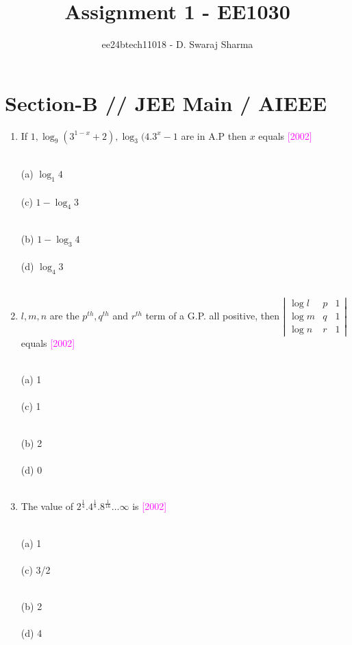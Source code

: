 \documentclass[journal,12pt,twocolumn]{IEEEtran}
\theoremstyle{remark}
\begin{document}

\vspace{3cm}

\title{Assignment 1 - EE1030}
\author{ee24btech11018 - D. Swaraj Sharma}
\maketitle
\newpage
\bigskip

\renewcommand{\thefigure}{\theenumi}
\renewcommand{\thetable}{\theenumi}

\section*{\textbf{Section-B} // \textbf{JEE Main} / \textbf{AIEEE}}

\begin{enumerate}[label=\textcolor{magenta}{\arabic*.}]
\newcommand{\question}[6]{
	 #1 \textcolor {magenta}{\hfill #2}\\ \\
\begin{minipage}{0.2\textwidth}
(a) #3 \\ \\
(c) #5 \\ \\
\end{minipage}
\hfill
\begin{minipage}{0.2\textwidth}
(b) #4 \\ \\
(d) #6 \\ \\
\end{minipage}

}

\item \question{If $ 1, \log_9 (3^{1-x} +2), \log_3 (4.3^x -1$ are in A.P then $x$ equals}{[2002]}
  {$\log_1 4$}
  {$1-\log_3 4$}
  {$1-\log_4 3$}
  {$\log_4 3$}

\item \question{$l, m, n$ are the $p^{th}, q^{th}$ and $r^{th}$ term of a G.P. all positive, then $\left|\begin{matrix} \log l & p & 1 \\ \log m & q & 1 \\ \log n & r & 1 \end{matrix}\right|$ equals}{[2002]}
{1}
{2}
{1}
{0}

\item \question{The value of $2^{\frac{1}{4}} . 4^{\frac{1}{8}} . 8^{\frac{1}{16}} \ldots \infty$ is}{[2002]}
  {1}
  {2}
  {3/2}
  {4}


\end{enumerate}
\end{document}
